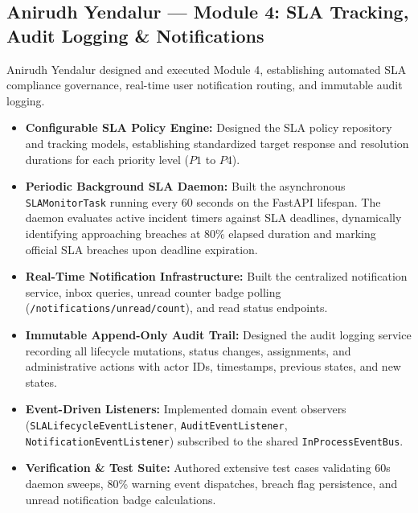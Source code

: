 \documentclass[11pt,a4paper,oneside]{report}
\begin{document}
\subsection{Anirudh Yendalur --- Module 4: SLA Tracking, Audit Logging \& Notifications}
\label{subsec:contrib_anirudh}
Anirudh Yendalur designed and executed Module 4, establishing automated SLA compliance governance, real-time user notification routing, and immutable audit logging.
\begin{itemize}
    \item \textbf{Configurable SLA Policy Engine:} Designed the SLA policy repository and tracking models, establishing standardized target response and resolution durations for each priority level ($P1$ to $P4$).
    \item \textbf{Periodic Background SLA Daemon:} Built the asynchronous \texttt{SLAMonitorTask} running every 60 seconds on the FastAPI lifespan. The daemon evaluates active incident timers against SLA deadlines, dynamically identifying approaching breaches at 80\% elapsed duration and marking official SLA breaches upon deadline expiration.
    \item \textbf{Real-Time Notification Infrastructure:} Built the centralized notification service, inbox queries, unread counter badge polling (\texttt{/notifications/unread/count}), and read status endpoints.
    \item \textbf{Immutable Append-Only Audit Trail:} Designed the audit logging service recording all lifecycle mutations, status changes, assignments, and administrative actions with actor IDs, timestamps, previous states, and new states.
    \item \textbf{Event-Driven Listeners:} Implemented domain event observers (\texttt{SLALifecycleEventListener}, \texttt{AuditEventListener}, \texttt{NotificationEventListener}) subscribed to the shared \texttt{InProcessEventBus}.
    \item \textbf{Verification \& Test Suite:} Authored extensive test cases validating 60s daemon sweeps, 80\% warning event dispatches, breach flag persistence, and unread notification badge calculations.
\end{itemize}
\end{document}
